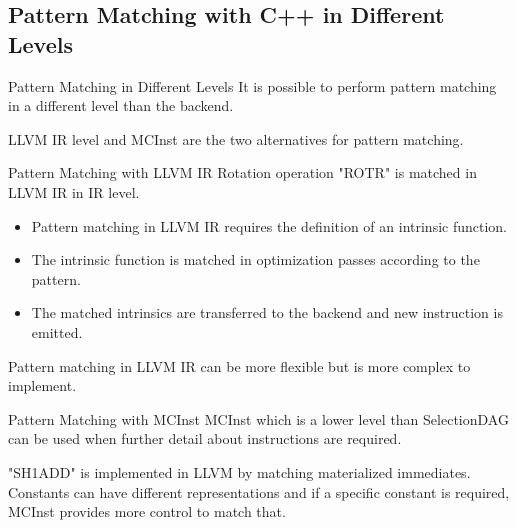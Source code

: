\ifAdvanced
    
\fi

\subsection{Pattern Matching with C++ in Different Levels}


\begin{frame}{Pattern Matching in Different Levels}
It is possible to perform pattern matching in a different level than the backend. 

LLVM IR level and MCInst are the two alternatives for pattern matching.
\begin{center}
\end{center}
\end{frame}

\begin{frame}{Pattern Matching with LLVM IR}
Rotation operation "ROTR" is matched in LLVM IR in IR level.
    \begin{itemize}
        \item Pattern matching in LLVM IR requires the definition of an intrinsic function.
        \item The intrinsic function is matched in optimization passes according to the pattern.
        \item The matched intrinsics are transferred to the backend and new instruction is emitted.
    \end{itemize}
    Pattern matching in LLVM IR can be more flexible but is more complex to implement.
\end{frame}

\begin{frame}{Pattern Matching with MCInst}
MCInst which is a lower level than SelectionDAG can be used when further detail about instructions are required.

"SH1ADD" is implemented in LLVM by matching materialized immediates. Constants can have different representations and if a specific constant is required, MCInst provides more control to match that. 
\end{frame}


